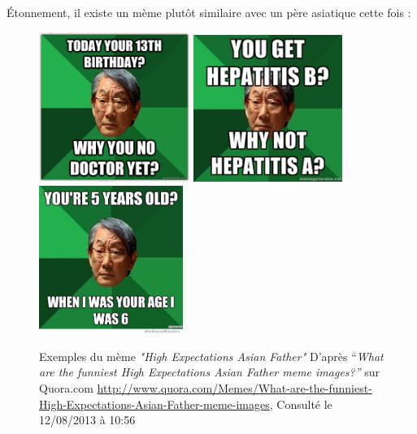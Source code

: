 \'Etonnement, il existe un m\`eme plut\^ot similaire avec un p\`ere asiatique cette fois : 


\begin{figure}
    \includegraphics[width=1.9335in,height=1.9224in]{figures/chap2/chapitre2-img11.png}
    \includegraphics[width=1.9004in,height=1.8894in]{figures/chap2/chapitre2-img12.jpg}
    \includegraphics[width=1.8449in,height=1.9004in]{figures/chap2/chapitre2-img13.jpg}
    \caption[\textit{"High Expectations Asian Father"} d'après Quora.com]{Exemples du m\`eme \textit{"High Expectations Asian Father"} D{\textquoteright}apr\`es {\textquotedblleft}\textit{What are the funniest High Expectations Asian Father meme images?{\textquotedblright}} sur Quora.com \url{http://www.quora.com/Memes/What-are-the-funniest-High-Expectations-Asian-Father-meme-images}, Consult\'e le 12/08/2013 \`a 10:56}
    \label{fig:severe-chinese-dad}
\end{figure}

